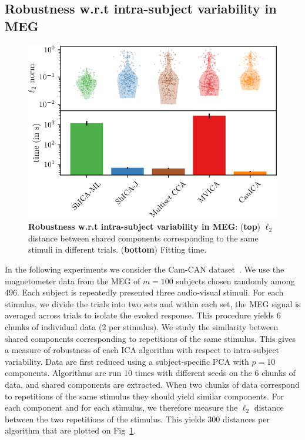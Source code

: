 \subsection{Robustness w.r.t intra-subject variability in MEG}
\begin{figure}
  \centering
  \includegraphics[width=.65\linewidth]{./figures/amvica/inter_subject_stability.pdf}
  \caption{\textbf{Robustness w.r.t intra-subject variability in MEG}:
    (\textbf{top}) $\ell_2$ distance between shared components corresponding to the same stimuli in different trials.  (\textbf{bottom}) Fitting time.
}
\label{fig:eeg_intragroup_variability}
\end{figure}
In the following experiments we consider the Cam-CAN
dataset~\cite{taylor2017cambridge}. We use the magnetometer data from the MEG of $m=100$ subjects chosen randomly among 496.
% 
Each subject is repeatedly presented three audio-visual stimuli. 
% 
For each stimulus, we divide the trials into two sets and within each set, %
the MEG signal is averaged across trials to isolate the evoked response. This
procedure yields 6 chunks of individual data (2 per stimulus).
%
%
We study the similarity between shared components corresponding to repetitions of the same stimulus. This gives a measure of robustness of each ICA algorithm with respect
to intra-subject variability.
Data are first reduced using a subject-specific PCA with $p=10$ components. Algorithms are run 10 times with different seeds on the 6 chunks of data,
and shared components are extracted.
%
When two chunks of data correspond to repetitions of the same stimulus they should yield similar
components.
%
For each component and for each stimulus, we therefore measure the $\ell_2$
distance between the two repetitions of the stimulus.
 This yields $300$ distances per algorithm that are
plotted on Fig~\ref{fig:eeg_intragroup_variability}.

